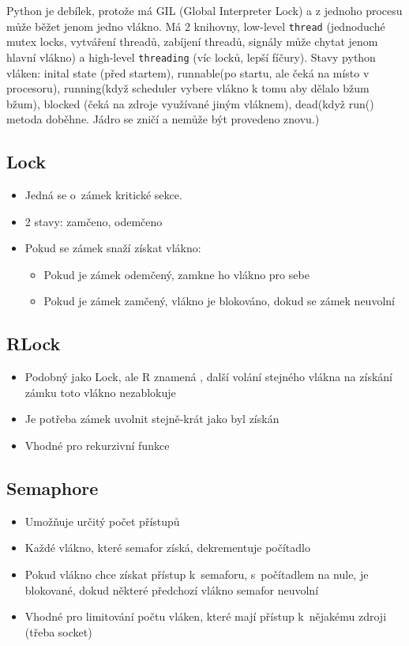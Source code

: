 Python je debílek, protože má GIL (Global Interpreter Lock) a z jednoho procesu může běžet jenom jedno vlákno. Má 2 knihovny, low-level \texttt{thread} (jednoduché mutex locks, vytváření threadů, zabíjení threadů, signály může chytat jenom hlavní vlákno) a high-level \texttt{threading} (víc locků, lepší fíčury). Stavy python vláken: inital state (před startem), runnable(po startu, ale čeká na místo v procesoru), running(když scheduler vybere vlákno k tomu aby dělalo bžum bžum), blocked (čeká na zdroje využívané jiným vláknem), dead(když run() metoda doběhne. Jádro se zničí a nemůže být provedeno znovu.)

\subsection{Lock}
\begin{itemize}
    \item Jedná se o~zámek kritické sekce. 
    \item 2 stavy: zamčeno, odemčeno
    \item Pokud se zámek snaží získat vlákno:
    \begin{itemize}
        \item Pokud je zámek odemčený, zamkne ho vlákno pro sebe
        \item Pokud je zámek zamčený, vlákno je blokováno, dokud se zámek neuvolní
    \end{itemize}
\end{itemize}

\subsection{RLock}
\begin{itemize}
    \item Podobný jako Lock, ale R znamená , další volání stejného vlákna na získání zámku toto vlákno nezablokuje
    \item Je potřeba zámek uvolnit stejně-krát jako byl získán
    \item Vhodné pro rekurzivní funkce
\end{itemize}

\subsection{Semaphore}
\begin{itemize}
    \item Umožňuje určitý počet přístupů
    \item Každé vlákno, které semafor získá, dekrementuje počítadlo
    \item Pokud vlákno chce získat přístup k~semaforu, s~počítadlem na nule, je blokované, dokud některé předchozí vlákno semafor neuvolní
    \item Vhodné pro limitování  počtu vláken, které mají přístup k~nějakému zdroji (třeba socket)
\end{itemize}



